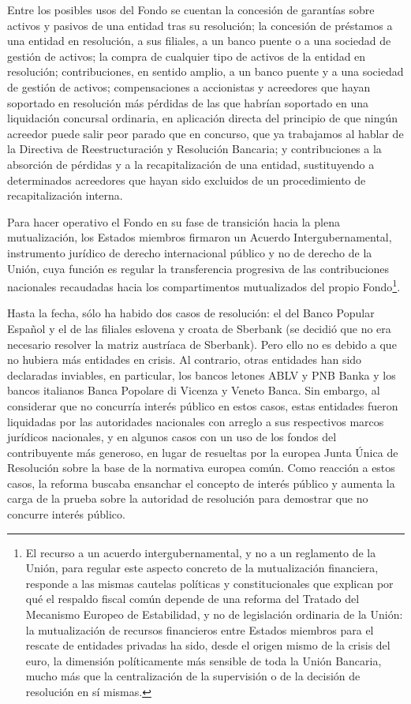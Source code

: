 \documentclass[10pt,a4paper]{article}
\begin{document}
{Entre los posibles usos del Fondo se cuentan la concesión de garantías sobre activos y pasivos de una entidad tras su resolución; la concesión de préstamos a una entidad en resolución, a sus filiales, a un banco puente o a una sociedad de gestión de activos; la compra de cualquier tipo de activos de la entidad en resolución; contribuciones, en sentido amplio, a un banco puente y a una sociedad de gestión de activos; compensaciones a accionistas y acreedores que hayan soportado en resolución más pérdidas de las que habrían soportado en una liquidación concursal ordinaria, en aplicación directa del principio de que ningún acreedor puede salir peor parado que en concurso, que ya trabajamos al hablar de la Directiva de Reestructuración y Resolución Bancaria; y contribuciones a la absorción de pérdidas y a la recapitalización de una entidad, sustituyendo a determinados acreedores que hayan sido excluidos de un procedimiento de recapitalización interna. 

Para hacer operativo el Fondo en su fase de transición hacia la plena mutualización, los Estados miembros firmaron un Acuerdo Intergubernamental, instrumento jurídico de derecho internacional público y no de derecho de la Unión, cuya función es regular la transferencia progresiva de las contribuciones nacionales recaudadas hacia los compartimentos mutualizados del propio Fondo\footnote{%
    El recurso a un acuerdo intergubernamental, y no a un reglamento de la Unión, para regular este aspecto concreto de la mutualización financiera, responde a las mismas cautelas políticas y constitucionales que explican por qué el respaldo fiscal común depende de una reforma del Tratado del Mecanismo Europeo de Estabilidad, y no de legislación ordinaria de la Unión: la mutualización de recursos financieros entre Estados miembros para el rescate de entidades privadas ha sido, desde el origen mismo de la crisis del euro, la dimensión políticamente más sensible de toda la Unión Bancaria, mucho más que la centralización de la supervisión o de la decisión de resolución en sí mismas.
}.









Hasta la fecha, sólo ha habido dos casos de resolución: el del Banco Popular Español y el de las filiales eslovena y croata de Sberbank (se decidió que no era necesario resolver la matriz austríaca de Sberbank). Pero ello no es debido a que no hubiera más entidades en crisis. Al contrario, otras entidades han sido declaradas inviables, en particular, los bancos letones ABLV y PNB Banka y los bancos italianos Banca Popolare di Vicenza y Veneto Banca. Sin embargo, al considerar que no concurría interés público en estos casos, estas entidades fueron liquidadas por las autoridades nacionales con arreglo a sus respectivos marcos jurídicos nacionales, y en algunos casos con un uso de los fondos del contribuyente más generoso, en lugar de resueltas por la europea Junta Única de Resolución sobre la base de la normativa europea común. Como reacción a estos casos, la reforma buscaba ensanchar el concepto de interés público y aumenta la carga de la prueba sobre la autoridad de resolución para demostrar que no concurre interés público.

}
\end{document}
